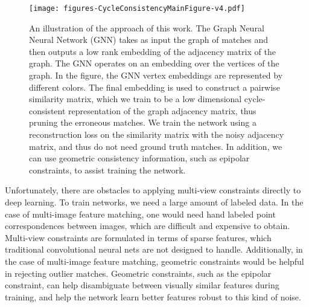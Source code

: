 \documentclass[10pt,twocolumn,letterpaper]{article}
\begin{document}
\begin{figure}[t]
\begin{center}
  \texttt{[image: figures-CycleConsistencyMainFigure-v4.pdf]}
\end{center}
  \caption{
    An illustration of the approach of this work.
    The Graph Neural Neural Network (GNN) \cite{battaglia2018relational} takes as input the graph of matches and then outputs a low rank embedding of the adjacency matrix of the graph.
    The GNN operates on an embedding over the vertices of the graph.
    In the figure, the GNN vertex embeddings are represented by different colors.
    The final embedding is used to construct a pairwise similarity matrix, which we train to be a low dimensional cycle-consistent representation of the graph adjacency matrix, thus pruning the erroneous matches.
    We train the network using a reconstruction loss on the similarity matrix with the noisy adjacency matrix, and thus do not need ground truth matches.
    In addition, we can use geometric consistency information, such as epipolar constraints, to assist training the network.
  }
\label{fig:pipeline}
\label{fig:onecol}
\end{figure}

Unfortunately, there are obstacles to applying multi-view constraints directly to deep learning. 
To train networks, we need a large amount of labeled data.
In the case of multi-image feature matching, one would need hand labeled point correspondences between images, which are difficult and expensive to obtain.
Multi-view constraints are formulated in terms of sparse features, which traditional convolutional neural nets are not designed to handle.
Additionally, in the case of multi-image feature matching, geometric constraints would be helpful in rejecting outlier matches.
Geometric constraints, such as the epipolar constraint, can help disambiguate between visually similar features during training, and help the network learn better features robust to this kind of noise.
\end{document}
